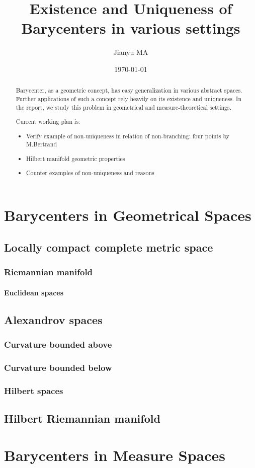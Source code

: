 \documentclass{report}
\title{Existence and Uniqueness of Barycenters in various settings}
\author{Jianyu MA}
\date{\today}
\theoremstyle{remark}
\theoremstyle{definition}
\begin{document}
\maketitle

\begin{abstract}
	Barycenter, as a geometric concept, has easy generalization in various abstract spaces. Further applications of such a concept rely heavily on its existence and uniqueness. In the report, we study this problem in geometrical and measure-theoretical settings.

	Current working plan is:
	\begin{itemize}
		\item Verify example of non-uniqueness in relation of non-branching: four points by M.Bertrand
		\item Hilbert manifold geometric properties
		\item Counter examples of non-uniqueness and reasons
	\end{itemize}
\end{abstract}

\tableofcontents
{}


\part{Barycenters in Geometrical Spaces}

\chapter{Locally compact complete metric space}

\section{Riemannian manifold}
\subsection{Euclidean spaces}

\chapter{Alexandrov spaces}
\section{Curvature bounded above}
\section{Curvature bounded below}
\section{Hilbert spaces}

\chapter{Hilbert Riemannian manifold}

\part{Barycenters in Measure Spaces}


\printbibliography
\end{document}
